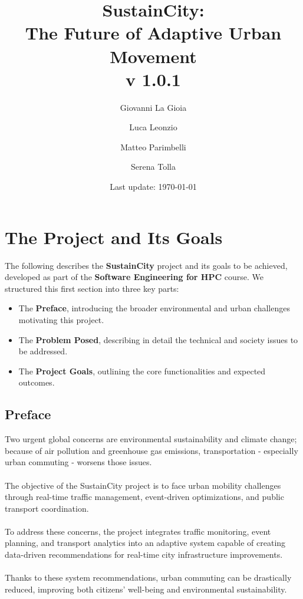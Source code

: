 \documentclass[a4paper,12pt]{article}
\title{SustainCity: \\ The Future of Adaptive Urban Movement \\ v 1.0.1} %
\author[1]{Giovanni La Gioia}
\author[2]{Luca Leonzio}
\author[3]{Matteo Parimbelli}
\author[4]{Serena Tolla}
\affil[1,2,3,4]{Politecnico di Milano}
\date{Last update: \today}
\begin{document}
\maketitle
\newpage
\tableofcontents
\clearpage
\newpage

\section{The Project and Its Goals}
The following describes the \textbf{SustainCity} project and its goals to be achieved, developed as part of the \textbf{Software Engineering for HPC} course. We structured this first section into three key parts:
\begin{itemize}
    \item The \textbf{Preface}, introducing the broader environmental and urban challenges motivating this project.
    \item The \textbf{Problem Posed}, describing in detail the technical and society issues to be addressed.
    \item The \textbf{Project Goals}, outlining the core functionalities and expected outcomes.
\end{itemize}

\subsection*{Preface}
Two urgent global concerns are environmental sustainability and climate change; because of air pollution and greenhouse gas emissions, transportation - especially urban commuting - worsens those issues. 
\\ \\ The objective of the SustainCity project is to face urban mobility challenges through real-time traffic management, event-driven optimizations, and public transport coordination. 
\\ \\To address these concerns, the project integrates traffic monitoring, event planning, and transport analytics into an adaptive system capable of creating data-driven recommendations for real-time city infrastructure improvements. 
\\ \\Thanks to these system recommendations, urban commuting can be drastically reduced, improving both citizens’ well-being and environmental sustainability.
\end{document}
